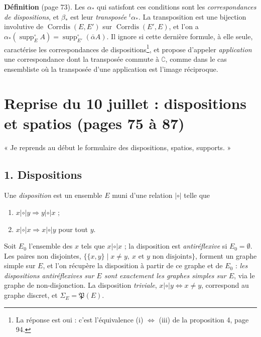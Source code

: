 \documentclass[11pt,a4paper]{article}
\begin{document}
\textbf{Définition} (page 73). Les $\alpha_{*}$ qui satisfont ces conditions sont
les \emph{correspondances de dispositions}, et $\beta_{*}$ est leur
\emph{transposée} ${}^{t}\alpha_{*}$. La transposition est une bijection
involutive de $\operatorname{Corrdis}(E, E')$ sur $\operatorname{Corrdis}(E',
E)$, et l'on a $\alpha_{*}(\operatorname{supp}^{\circ}_{E} A) =
\operatorname{supp}^{\circ}_{E'}(\bar\alpha A)$. Il ignore si cette dernière
formule, à elle seule, caractérise les correspondances de
dispositions\footnote{La réponse est oui : c'est l'équivalence (i) $\iff$ (iii) de
la proposition 4, page 94.}, et propose d'appeler \emph{application} une
correspondance dont la transposée commute à $\complement$, comme dans le cas
ensembliste où la transposée d'une application est l'image réciproque.

\section*{Reprise du 10 juillet : dispositions et spatios (pages 75 à 87)}

« Je reprends au début le formulaire des dispositions, spatios, supports. »

\subsection*{1. Dispositions}

Une \emph{disposition} est un ensemble $E$ muni d'une relation
$\mathrel{|\circ|}$ telle que
\begin{enumerate}
\item[Disp 1.] $x \mathrel{|\circ|} y \Rightarrow y \mathrel{|\circ|} x$ ;
\item[Disp 2.] $x \mathrel{|\circ|} x \Rightarrow x \mathrel{|\circ|} y$ pour tout
$y$.
\end{enumerate}
Soit $E_{0}$ l'ensemble des $x$ tels que $x \mathrel{|\circ|} x$ ; la disposition
est \emph{antiréflexive} si $E_{0} = \emptyset$. Les paires non disjointes,
$\{\{x, y\} \mid x \neq y,\ x \text{ et } y \text{ non disjoints}\}$, forment un
graphe simple sur $E$, et l'on récupère la disposition à partir de ce graphe et
de $E_{0}$ : \emph{les dispositions antiréflexives sur $E$ sont exactement les
graphes simples sur $E$}, via le graphe de non-disjonction. La disposition
\emph{triviale}, $x \mathrel{|\circ|} y \iff x \neq y$, correspond au graphe
discret, et $\Sigma_{E} = \mathfrak{P}(E)$.
\end{document}
